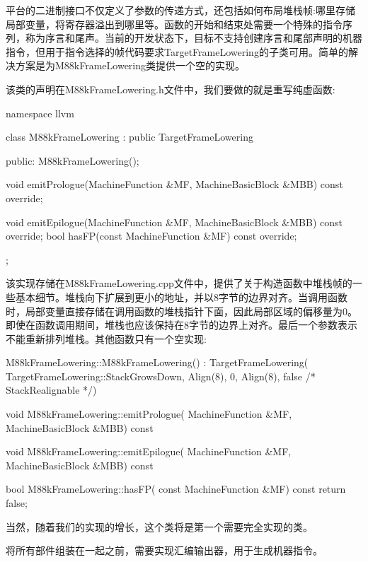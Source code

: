平台的二进制接口不仅定义了参数的传递方式，还包括如何布局堆栈帧:哪里存储局部变量，将寄存器溢出到哪里等。函数的开始和结束处需要一个特殊的指令序列，称为序言和尾声。当前的开发状态下，目标不支持创建序言和尾部声明的机器指令，但用于指令选择的帧代码要求TargetFrameLowering的子类可用。简单的解决方案是为M88kFrameLowering类提供一个空的实现。

该类的声明在M88kFrameLowering.h文件中，我们要做的就是重写纯虚函数:

\begin{cpp}
namespace llvm {
class M88kFrameLowering : public TargetFrameLowering {
public:
    M88kFrameLowering();

    void
    emitPrologue(MachineFunction &MF,
    MachineBasicBlock &MBB) const override;

    void
    emitEpilogue(MachineFunction &MF,
                 MachineBasicBlock &MBB) const override;
    bool hasFP(const MachineFunction &MF) const override;
};
}
\end{cpp}

该实现存储在M88kFrameLowering.cpp文件中，提供了关于构造函数中堆栈帧的一些基本细节。堆栈向下扩展到更小的地址，并以8字节的边界对齐。当调用函数时，局部变量直接存储在调用函数的堆栈指针下面，因此局部区域的偏移量为0。即使在函数调用期间，堆栈也应该保持在8字节的边界上对齐。最后一个参数表示不能重新排列堆栈。其他函数只有一个空实现:

\begin{cpp}
M88kFrameLowering::M88kFrameLowering()
    : TargetFrameLowering(
        TargetFrameLowering::StackGrowsDown, Align(8),
        0, Align(8), false /* StackRealignable */) {}

void M88kFrameLowering::emitPrologue(
    MachineFunction &MF, MachineBasicBlock &MBB) const {}

void M88kFrameLowering::emitEpilogue(
    MachineFunction &MF, MachineBasicBlock &MBB) const {}

bool M88kFrameLowering::hasFP(
    const MachineFunction &MF) const { return false; }
\end{cpp}

当然，随着我们的实现的增长，这个类将是第一个需要完全实现的类。

将所有部件组装在一起之前，需要实现汇编输出器，用于生成机器指令。

















































